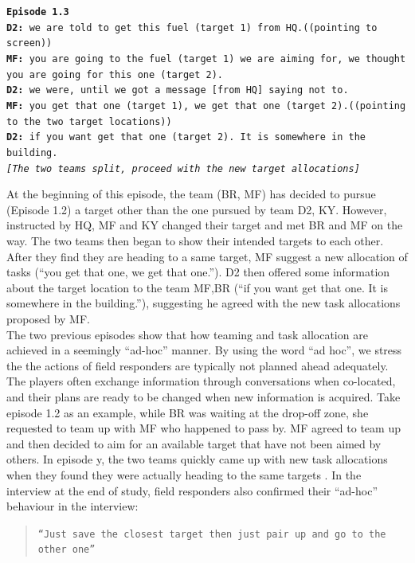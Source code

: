 \noindent\texttt{\textbf{Episode 1.3}\\
\textbf{D2:} we are told to get this fuel (target 1) from HQ.((pointing to screen))\\
\textbf{MF:} you are going to the fuel (target 1) we are aiming for, we thought you are going for this one (target 2).\\
\textbf{D2:} we were, until we got a message [from HQ] saying not to. \\
\textbf{MF:} you get that one (target 1), we get that one (target 2).((pointing to the two target locations))\\
\textbf{D2:} if you want get that one (target 2). It is somewhere in the building.\\
\emph{[The two teams split, proceed with the new target allocations]}\\}

At the beginning of this episode, the team (BR, MF) has decided to pursue (Episode 1.2) a target other than the one pursued by team D2, KY. However, instructed by HQ, MF and KY changed their target and met BR and MF on the way. The two teams then began to show their intended targets to each other. After they find they are heading to a same target, MF suggest a new allocation of tasks (``you get that one, we get that one.''). D2 then offered some information about the target location to the team MF,BR (``if you want get that one. It is somewhere in the building.''), suggesting he agreed with the new task allocations proposed by MF. \\

The two previous episodes show that how teaming and task allocation are achieved in a seemingly ``ad-hoc'' manner. By using the word ``ad hoc'', we stress the the actions of field responders are typically not planned ahead adequately. The players often exchange information through conversations when co-located, and their plans are ready to be changed when new information is acquired. Take episode 1.2 as an example, while BR was waiting at the drop-off zone, she requested to team up with MF who happened to pass by. MF agreed to team up and then decided to aim for an available target that have not been aimed by others. In episode y, the two teams quickly came up with new task allocations when they found they were actually heading to the same targets . In the interview at the end of study, field responders also confirmed their ``ad-hoc'' behaviour in the interview:\\

\begin{quote}
\texttt{``Just save the closest target then just pair up and go to the other one'' }
\end{quote}

